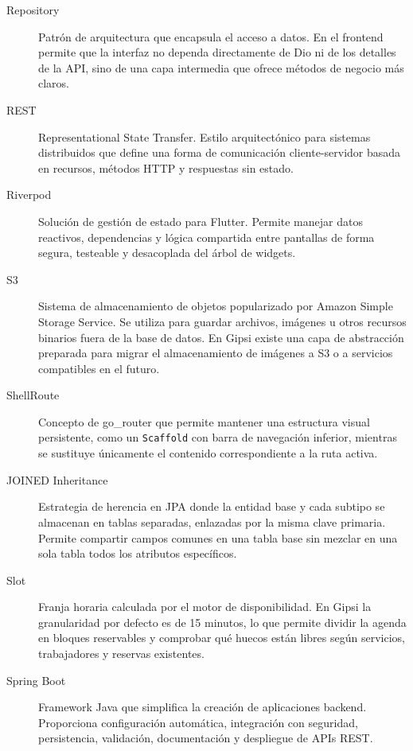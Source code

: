 \documentclass[12pt,a4paper,twoside]{report}
\begin{document}
\begin{description}
  \item[Repository]
  Patrón de arquitectura que encapsula el acceso a datos. En el frontend permite que la
  interfaz no dependa directamente de Dio ni de los detalles de la API, sino de una capa
  intermedia que ofrece métodos de negocio más claros.

  \item[REST]
  Representational State Transfer. Estilo arquitectónico para sistemas distribuidos que
  define una forma de comunicación cliente-servidor basada en recursos, métodos HTTP
  y respuestas sin estado.

  \item[Riverpod]
  Solución de gestión de estado para Flutter. Permite manejar datos reactivos,
  dependencias y lógica compartida entre pantallas de forma segura, testeable y
  desacoplada del árbol de widgets.

  \item[S3]
  Sistema de almacenamiento de objetos popularizado por Amazon Simple Storage Service.
  Se utiliza para guardar archivos, imágenes u otros recursos binarios fuera de la base
  de datos. En Gipsi existe una capa de abstracción preparada para migrar el almacenamiento
  de imágenes a S3 o a servicios compatibles en el futuro.

  \item[ShellRoute]
  Concepto de go\_router que permite mantener una estructura visual persistente, como
  un \texttt{Scaffold} con barra de navegación inferior, mientras se sustituye únicamente
  el contenido correspondiente a la ruta activa.

  \item[JOINED Inheritance]
  Estrategia de herencia en JPA donde la entidad base y cada subtipo se almacenan en
  tablas separadas, enlazadas por la misma clave primaria. Permite compartir campos
  comunes en una tabla base sin mezclar en una sola tabla todos los atributos específicos.

  \item[Slot]
  Franja horaria calculada por el motor de disponibilidad. En Gipsi la granularidad por
  defecto es de 15 minutos, lo que permite dividir la agenda en bloques reservables y
  comprobar qué huecos están libres según servicios, trabajadores y reservas existentes.

  \item[Spring Boot]
  Framework Java que simplifica la creación de aplicaciones backend. Proporciona
  configuración automática, integración con seguridad, persistencia, validación,
  documentación y despliegue de APIs REST.


\end{description}
\end{document}
